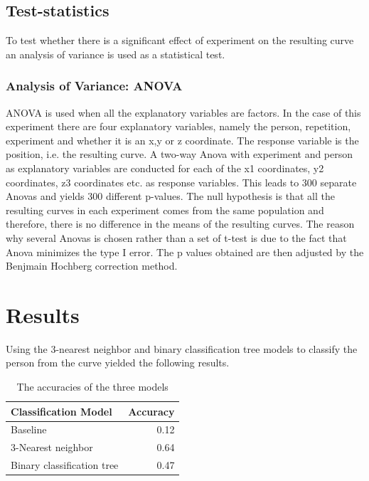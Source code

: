 \documentclass[11pt, fleqn, titlepage]{article}
\begin{document}
\subsection*{Test-statistics}
To test whether there is a significant effect of experiment on the resulting curve an analysis of variance is used as a statistical test. 

\subsubsection*{Analysis of Variance: ANOVA}
ANOVA is used when all the explanatory variables are factors. In the case of this experiment there are four explanatory variables, namely the person, repetition, experiment and whether it is an x,y or z coordinate. The response variable is the position, i.e. the resulting curve. A two-way Anova with experiment and person as explanatory variables are conducted for each of the x1 coordinates, y2 coordinates, z3 coordinates etc. as response variables. This leads to 300 separate Anovas and yields 300 different p-values. The null hypothesis is that all the resulting curves in each experiment comes from the same population and therefore, there is no difference in the means of the resulting curves. The reason why several Anovas is chosen rather than a set of t-test is due to the fact that Anova minimizes the type I error. The p values obtained are then adjusted by the Benjmain Hochberg correction method. \cite{statbog, BH}


\section{Results}
Using the 3-nearest neighbor and binary classification tree models to classify the person from the curve yielded the following results.

\begin{table}[h]
	\centering
	\begin{tabular}{l r}
		\toprule
		Classification Model       & Accuracy  \\ \midrule
		Baseline                   & 0.12      \\
		3-Nearest neighbor         & 0.64      \\ 
		Binary classification tree & 0.47      \\ \bottomrule
	\end{tabular}
\caption{The accuracies of the three models}
\label{accuracies}
\end{table}
\end{document}
